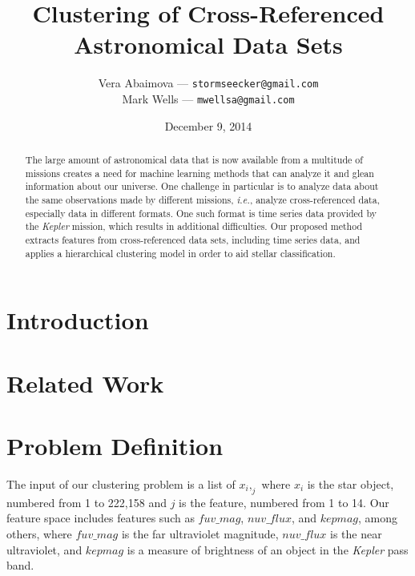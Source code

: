 \documentclass[12pt]{article}
\title{
	Clustering of Cross-Referenced Astronomical Data Sets
}
\author{
	Vera Abaimova --- \texttt{stormseecker@gmail.com} \\ 
        Mark Wells --- \texttt{mwellsa@gmail.com}
}
\date{December 9, 2014}
\begin{document}
\maketitle

\begin{abstract}
The large amount of astronomical data that is now available from a multitude of missions creates a need for machine learning methods that can analyze it and glean information about our universe.
One challenge in particular is to analyze data about the same observations made by different missions, \textit{i.e.}, analyze cross-referenced data, especially data in different formats.
One such format is time series data provided by the \textit{Kepler} mission, which results in additional difficulties.
Our proposed method extracts features from cross-referenced data sets, including time series data, and applies a hierarchical clustering model in order to aid stellar classification.

\end{abstract}

\section{Introduction} %
\label{sec:Introduction}


\section{Related Work} %
\label{sec:Related Work}


\section{Problem Definition} %
\label{sec:Problem Definition}


The input of our clustering problem is a list of $x_i,_j$ where $x_i$ is the star object, numbered from 1 to 222,158 and $j$ is the feature, numbered from 1 to 14.
Our feature space includes features such as $fuv\_mag$, $nuv\_flux$, and $kepmag$, among others, where $fuv\_mag$ is the far ultraviolet magnitude, $nuv\_flux$ is the near ultraviolet, and $kepmag$ is a measure of brightness of an object in the \textit{Kepler} pass band.
\end{document}
